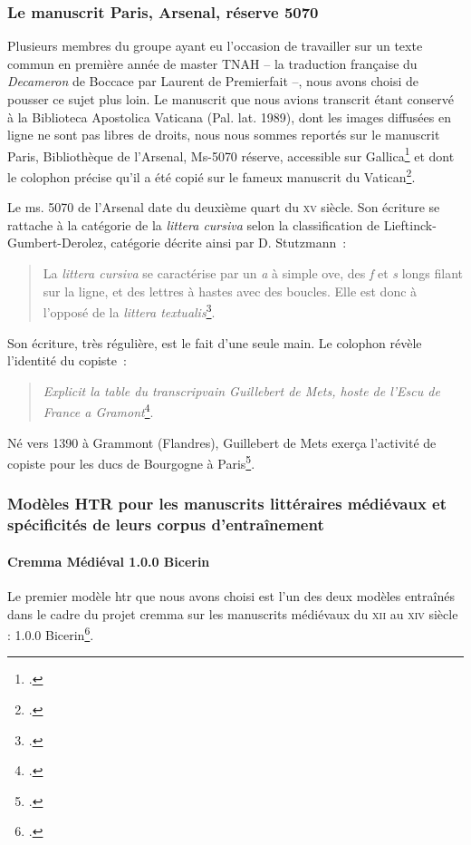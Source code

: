 \documentclass{article}
\newcommand{\siecle}[1]{\textsc{#1}\ieme}
\begin{document}
	\subsubsection{Le manuscrit Paris, Arsenal, réserve 5070}
	Plusieurs membres du groupe ayant eu l'occasion de travailler sur un texte commun en première année de master TNAH – la traduction française du \textit{Decameron} de Boccace par Laurent de Premierfait –, nous avons choisi de pousser ce sujet plus loin.
	Le manuscrit que nous avions transcrit étant conservé à la Biblioteca Apostolica Vaticana (Pal. lat. 1989), dont les images diffusées en ligne ne sont pas libres de droits, nous nous sommes reportés sur le manuscrit Paris, Bibliothèque de l'Arsenal, Ms-5070 réserve, accessible sur Gallica\footcite{gallicaParisBibliothequeArsenal, bnfarchivesetmanuscritsMs5070BoccaceDecameron} et dont le colophon précise qu'il a été copié sur le fameux manuscrit du Vatican\footcite{jonas-irhtParisBibliothequeArsenal2012}.
	
	Le ms. 5070 de l'Arsenal date du deuxième quart du \siecle{xv} siècle. Son écriture se rattache à la catégorie de la \textit{littera cursiva} selon la classification de Lieftinck-Gumbert-Derolez, catégorie décrite ainsi par D. Stutzmann~:
	\begin{quote}La \textit{littera cursiva} se caractérise par un \textit{a} à simple ove, des \textit{f} et \textit{s} longs filant sur la ligne, et des lettres à hastes avec des boucles. Elle est donc à l’opposé de la \textit{littera textualis}\footcite{stutzmannEcrituresGothiquesLivresques2022}.\end{quote}
	
	Son écriture, très régulière, est le fait d'une seule main. Le colophon révèle l'identité du copiste~: \begin{quote}
		\textit{Explicit la table du transcripvain Guillebert de Mets, hoste de l'Escu de France a Gramont}\footcite{jonas-irhtParisBibliothequeArsenal2012}.
	\end{quote}Né vers 1390 à Grammont (Flandres), Guillebert de Mets exerça l'activité de copiste pour les ducs de Bourgogne à Paris\footcite{jonas-irhtGuillebertMets}. 
	
	\subsubsection{Modèles HTR pour les manuscrits littéraires médiévaux et spécificités de leurs corpus d'entraînement}
	\paragraph{Cremma Médiéval 1.0.0 Bicerin}
	Le premier modèle \gls{htr} que nous avons choisi est l'un des deux modèles entraînés dans le cadre du projet \gls{cremma} sur les manuscrits médiévaux du \siecle{xii} au \siecle{xiv} siècle : 1.0.0 Bicerin\footcite{pincheCREMMAMedievalOld2021}.
	
\end{document}
